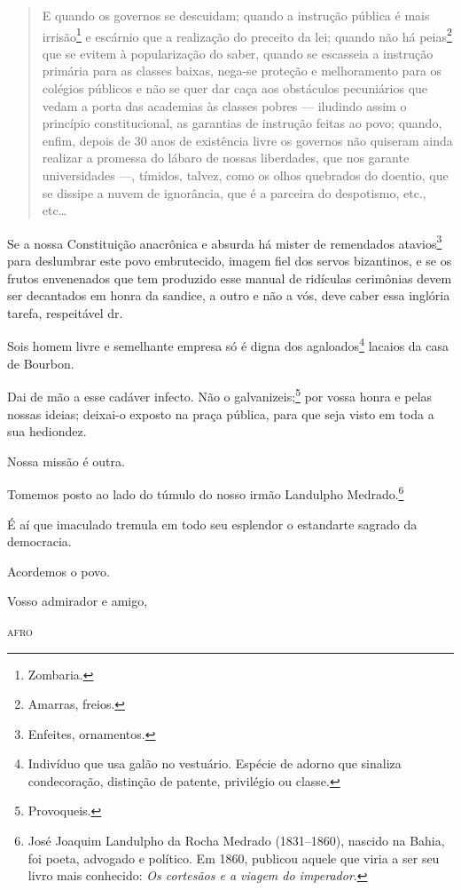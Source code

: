 \begin{quote}
E quando os governos se descuidam; quando a instrução pública é mais
irrisão\footnote{Zombaria.} e escárnio que a realização do preceito da
lei; quando não há peias\footnote{Amarras, freios.} que se evitem à
popularização do saber, quando se escasseia a instrução primária para as
classes baixas, nega-se proteção e melhoramento para os colégios
públicos e não se quer dar caça aos obstáculos pecuniários que vedam a
porta das academias às classes pobres --- iludindo assim o princípio
constitucional, as garantias de instrução feitas ao povo; quando, enfim,
depois de 30 anos de existência livre os governos não quiseram ainda
realizar a promessa do lábaro de nossas liberdades, que nos garante
universidades ---, tímidos, talvez, como os olhos quebrados do doentio,
que se dissipe a nuvem de ignorância, que é a parceira do despotismo,
etc., etc\ldots{}
\end{quote}

Se a nossa Constituição anacrônica e absurda há mister de remendados
atavios\footnote{Enfeites, ornamentos.} para deslumbrar este povo
embrutecido, imagem fiel dos servos bizantinos, e se os frutos
envenenados que tem produzido esse manual de ridículas cerimônias devem
ser decantados em honra da sandice, a outro e não a vós, deve caber essa
inglória tarefa, respeitável dr.

Sois homem livre e semelhante empresa só é digna dos
agaloados\footnote{Indivíduo que usa galão no vestuário. Espécie de
  adorno que sinaliza condecoração, distinção de patente, privilégio ou
  classe.} lacaios da casa de Bourbon.

Dai de mão a esse cadáver infecto. Não o galvanizeis;\footnote{
  Provoqueis.} por vossa honra e pelas nossas ideias; deixai-o exposto
na praça pública, para que seja visto em toda a sua hediondez.

Nossa missão é outra.

Tomemos posto ao lado do túmulo do nosso irmão Landulpho
Medrado.\footnote{José Joaquim Landulpho da Rocha Medrado (1831--1860),
  nascido na Bahia, foi poeta, advogado e político. Em 1860, publicou
  aquele que viria a ser seu livro mais conhecido: \emph{Os cortesãos e
  a viagem do imperador}.}

É aí que imaculado tremula em todo seu esplendor o estandarte sagrado da
democracia.

Acordemos o povo.

\begin{flushright}
Vosso admirador e amigo,

\textsc{afro}
\end{flushright}

